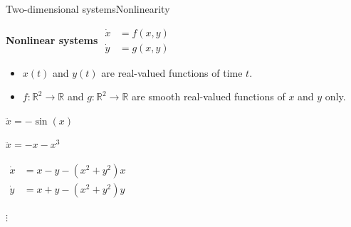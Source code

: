\documentclass[usenames,dvipsnames,svgnames,10pt,aspectratio=169]{beamer}
\begin{document}
\begin{frame}[t, c]{Two-dimensional systems}{Nonlinearity}
  \begin{minipage}{.48\textwidth}
    \begin{block}{\centering \textbf{Nonlinear systems}}
      \centering
      \(
      \begin{aligned}
        \dot{x} & = f(x, y) \\
        \dot{y} & = g(x, y)
      \end{aligned}
      \)
    \end{block}

    \bigskip

    \begin{itemize}
    \item $x(t)$ and $y(t)$ are real-valued functions of time $t$.

      \medskip

    \item $f : \mathbb{R}^2 \to \mathbb{R}$ and $g : \mathbb{R}^2 \to \mathbb{R}$ are smooth real-valued functions of $x$ and $y$ only.
    \end{itemize}
  \end{minipage}%
  \hfill
  \begin{minipage}{.48\textwidth}
    \centering

    \( \ddot{x} = -\sin(x) \)

    \bigskip

    \( \ddot{x} = -x - x^3 \)

    \bigskip

    \(
    \begin{aligned}
      \dot{x} & = x - y - (x^2 + y^2) x \\
      \dot{y} & = x + y - (x^2 + y^2) y
    \end{aligned}
    \)

    \bigskip

    \(\vdots \)
  \end{minipage}

  \vspace{1cm}
\end{frame}
\end{document}
